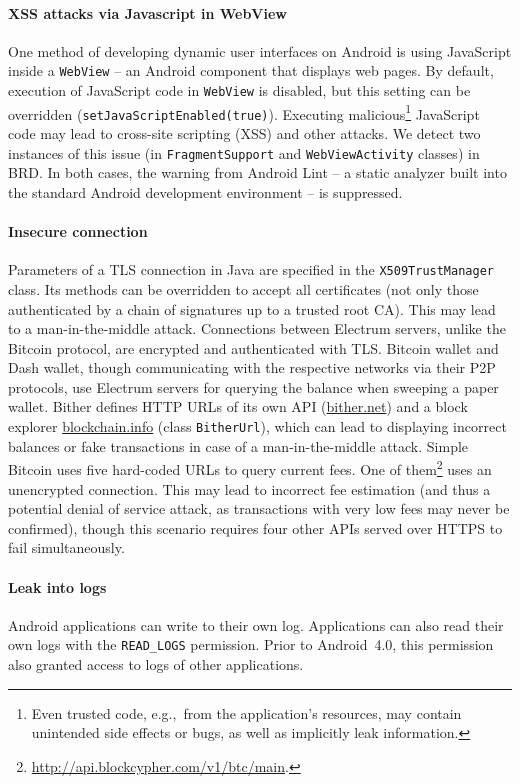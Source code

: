 \paragraph{XSS attacks via Javascript in WebView}
One method of developing dynamic user interfaces on Android is using JavaScript inside a \texttt{WebView} -- an Android component that displays web pages.
By default, execution of JavaScript code in \texttt{WebView} is disabled, but this setting can be overridden (\texttt{setJavaScriptEnabled(true)}).
Executing malicious\footnote{Even trusted code, e.g.,~from the application's resources, may contain unintended side effects or bugs, as well as implicitly leak information.} JavaScript code may lead to cross-site scripting (XSS) and other attacks.
We detect two instances of this issue (in \texttt{FragmentSupport} and \texttt{WebViewActivity} classes) in BRD.
In both cases, the warning from Android Lint -- a static analyzer built into the standard Android development environment -- is suppressed.

\paragraph{Insecure connection}
Parameters of a TLS connection in Java are specified in the \texttt{X509TrustManager} class.
Its methods can be overridden to accept all certificates (not only those authenticated by a chain of signatures up to a trusted root CA).
This may lead to a man-in-the-middle attack.
Connections between Electrum servers, unlike the Bitcoin protocol, are encrypted and authenticated with TLS.
Bitcoin wallet and Dash wallet, though communicating with the respective networks via their P2P protocols, use Electrum servers for querying the balance when sweeping a paper wallet.
Bither defines HTTP URLs of its own API (\url{bither.net}) and a block explorer \url{blockchain.info} (class \texttt{BitherUrl}), which can lead to displaying incorrect balances or fake transactions in case of a man-in-the-middle attack.
Simple Bitcoin uses five hard-coded URLs to query current fees.
One of them\footnote{\url{http://api.blockcypher.com/v1/btc/main}.} uses an unencrypted connection.
This may lead to incorrect fee estimation (and thus a potential denial of service attack, as transactions with very low fees may never be confirmed), though this scenario requires four other APIs served over HTTPS to fail simultaneously.

\paragraph{Leak into logs}
Android applications can write to their own log.
Applications can also read their own logs with the \texttt{READ\_LOGS} permission.
Prior to Android~4.0, this permission also granted access to logs of other applications.

